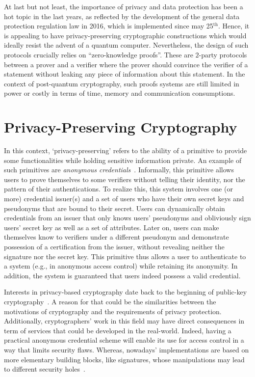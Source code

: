 At last but not least, the importance of privacy and data protection has been a hot topic in the last years, as reflected by the development of the general data protection regulation law in 2016, which is implemented since may 25$^\text{th}$.
Hence, it is appealing to have privacy-preserving cryptographic constructions which would ideally resist the advent of a quantum computer.
Nevertheless, the design of such protocols crucially relies on ``zero-knowledge proofs''. These are $2$-party protocols between a prover and a verifier where the prover should convince the verifier of a statement without leaking any piece of information about this statement.
In the context of post-quantum cryptography, such proofs systems are still limited in power or costly in terms of time, memory and communication consumptions.

\section{Privacy-Preserving Cryptography}
\label{se:privacy-preserving-crypto}

In this context, `privacy-preserving' refers to the ability of a primitive to provide some functionalities while holding sensitive information private.
An example of such primitives are \textit{anonymous credentials}~\cite{Cha85,CL01}.
Informally, this primitive allows users to prove themselves to some verifiers without telling their identity, nor the pattern of their authentications.
To realize this, this system involves one (or more) credential issuer(s) and a set of users who have their own secret keys and pseudonyms that are bound to their secret.
Users can dynamically obtain credentials from an issuer that only knows users' pseudonyms and obliviously sign users' secret key as well as a set of attributes.
Later on, users can make themselves know to verifiers under a different pseudonym and demonstrate possession of a certification from the issuer, without revealing neither the signature nor the secret key.
This primitive thus allows a user to authenticate to a system (e.g., in anonymous access control) while retaining its anonymity.
In addition, the system is guaranteed that users indeed possess a valid credential.

Interests in privacy-based cryptography date back to the beginning of public-key cryptography~\cite{Rab81,Cha82,GM82,Cha85}.
A reason for that could be the similarities between the motivations of cryptography and the requirements of privacy protection.
Additionally, cryptographers' work in this field may have direct consequences in term of services that could be developed in the real-world.
Indeed, having a practical anonymous credential scheme will enable its use for access control in a way that limits security flaws.
Whereas, nowadays' implementations are based on more elementary building blocks, like signatures, whose manipulations may lead to different security holes~\cite{VP17}.


